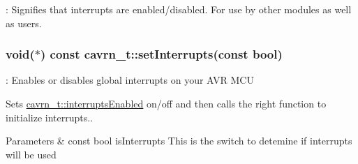 \-: Signifies that interrupts are enabled/disabled. For use by other modules as well as users. 

\hypertarget{a00017_ga23b9b26ea99d775a6479518802601749}{
\subsubsection[{set\-Interrupts}]{\setlength{\rightskip}{0pt plus 5cm}void($\ast$) const cavrn\-\_\-t\-::set\-Interrupts(const bool)}}\label{a00017_ga23b9b26ea99d775a6479518802601749}


\-: Enables or disables global interrupts on your A\-V\-R M\-C\-U 

Sets \hyperlink{a00017_gae49f03dd85f90f1079068562dd37163d}{cavrn\-\_\-t\-::interrupts\-Enabled} on/off and then calls the right function to initialize interrupts..


\begin{DoxyParams}{Parameters}
{\em } & const bool is\-Interrupts This is the switch to detemine if interrupts will be used \\
\hline
\end{DoxyParams}
